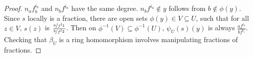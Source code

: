 \documentclass[a4paper,UKenglish,cleveref, autoref, thm-restate]{lipics-v2021}
\begin{document}
\begin{proof}
    $n_af_b^{i_b}$ and $n_bf^{i_a}$ have the same degree. $n_bf^{i_a}\not\in y$ follows from $b\not\in\phi(y)$. Since $s$ locally is a fraction, there are open sets $\phi(y)\in V\subseteq U$, such that for all $z\in V$, $s(z)$ is $\frac{\nicefrac{a}{f^{l_1}}}{\nicefrac{b}{f^{l_2}}}$. Then on $\phi^{-1}(V)\subseteq \phi^{-1}(U)$, $\psi_U(s)(y)$ is always $\frac{af^{l_2}}{bf^{l_1}}$. Checking that $\beta_U$ is a ring homomorphism involves manipulating fractions of fractions. 
\end{proof}
\end{document}
